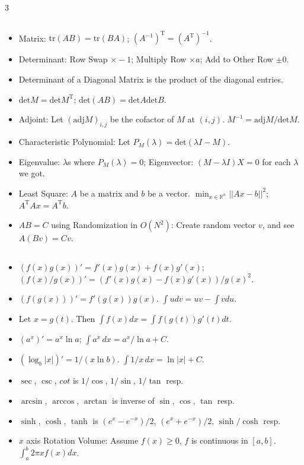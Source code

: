 \documentclass[landscape, 8pt, a4paper, oneside]{extarticle}
\begin{document}
\begin{multicols*}{3}
\subsection{}
\begin{itemize}
	\item Matrix: $\mathrm{tr}(AB) = \mathrm{tr}(BA)$; $(A^{-1})^{\mathrm{T}} = (A^{\mathrm{T}})^{-1}$.
	\item Determinant: Row Swap $\times -1$; Multiply Row $\times a$; Add to Other Row $\pm 0$.
	\item Determinant of a Diagonal Matrix is the product of the diagonal entries.
	\item $\mathrm{det} M = \mathrm{det} M^{\mathrm{T}}$; $\mathrm{det}(AB) = \mathrm{det} A \mathrm{det} B$.
	\item Adjoint: Let $(\mathrm{adj} M)_{i, j}$ be the cofactor of $M$ at $(i, j)$. $M^{-1} = \mathrm{adj} M / \mathrm{det} M$.
	\item Characteristic Polynomial: Let $P_M(\lambda) = \mathrm{det}(\lambda I - M)$.
	\item Eigenvalue: $\lambda$s where $P_M(\lambda) = 0$; Eigenvector: $(M - \lambda I) X = 0$ for each $\lambda$ we got.
	\item Least Square: $A$ be a matrix and $b$ be a vector. $\min_{x \in \mathbb{R}^n} ||Ax - b||^2$; $A^{\mathrm{T}} A x = A^{\mathrm{T}} b$.
	\item $AB = C$ using Randomization in $O(N^2)$: Create random vector $v$, and see $A(Bv) = Cv$.
\end{itemize}
\subsection{}
\begin{itemize}
	\item $(f(x) g(x))' = f'(x) g(x) + f(x) g'(x)$; $(f(x)/g(x))' = (f'(x) g(x) - f(x) g'(x)) / g(x)^2$.
	\item $(f(g(x)))' = f'(g(x)) g(x)$. $\int u dv = uv - \int v du$.
	\item Let $x = g(t)$. Then $\int f(x) dx = \int f(g(t)) g'(t) dt$.
	\item $(a^x)' = a^x \ln a$; $\int a^x \,dx= a^x / \ln a + C$.
	\item $(\log_b |x|)' = 1/(x \ln b)$. $\int 1/x \,dx = \ln |x| + C$.
	\item $\sec$, $\csc$, $cot$ is $1/\cos$, $1/\sin$, $1/\tan$ resp.
	\item $\arcsin$, $\arccos$, $\arctan$ is inverse of $\sin$, $\cos$, $\tan$ resp.
	\item $\sinh$, $\cosh$, $\tanh$ is $(e^x - e^{-x})/2$, $(e^x + e^{-x})/2$, $\sinh/\cosh$ resp.
	\item $x$ axis Rotation Volume: Assume $f(x) \ge 0$, $f$ is continuous in $[a, b]$. $\int_{a}^{b} 2 \pi x f(x) dx$.
\end{itemize}


\end{multicols*}
\end{document}
